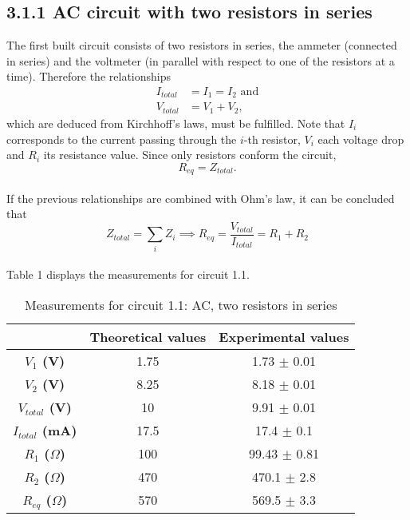 \documentclass[a4paper, 12pt]{article}
\begin{document}
\subsection{3.1.1 AC circuit with two resistors in series}
The first built circuit consists of two resistors in series, the ammeter (connected in series) and the voltmeter (in parallel with respect to one of the resistors at a time). Therefore the relationships
\begin{align*}\label{resser}
	I_{total} &= I_1 = I_2 \mbox{ and} \\
	V_{total} &= V_1 + V_2,
\end{align*}
which are deduced from Kirchhoff's laws, must be fulfilled. Note that $I_i$ corresponds to the current passing through the $i$-th resistor, $V_i$ each voltage drop and $R_i$ its resistance value. Since only resistors conform the circuit,
\begin{equation}\label{resserz}
	R_{eq} = Z_{total}.
\end{equation}\\

If the previous relationships are combined with Ohm's law, it can be concluded that
\begin{equation}\label{req}
	Z_{total} = \sum_{i} Z_i \implies R_{eq} = \frac{V_{total}}{I_{total}}= R_1 + R_2
\end{equation}\\

Table 1 displays the measurements for circuit 1.1.
\begin{table}[hbt!]
	\centering
	\begin{tabular}{|c|c|c|}
		\hline
		& \textbf{Theoretical values} & \textbf{Experimental values} \\
		\hline
		\textbf{$V_{1}$ (V)} & 1.75 & 1.73 $\pm$ 0.01 \\
		\textbf{$V_{2}$ (V)} & 8.25 & 8.18 $\pm$ 0.01 \\
		\textbf{$V_{total}$ (V)} & 10 & 9.91 $\pm$ 0.01 \\
		\hline
		\textbf{$I_{total}$ (mA)} & 17.5 & 17.4 $\pm$ 0.1 \\
		\hline
		\textbf{$R_{1}$ ($\Omega$)} & 100 & 99.43 $\pm$ 0.81 \\
		\textbf{$R_{2}$ ($\Omega$)} & 470 & 470.1 $\pm$ 2.8 \\
		\textbf{$R_{eq}$ ($\Omega$)} & 570 & 569.5 $\pm$ 3.3 \\
	
		\hline
	\end{tabular}
	\caption{Measurements for circuit 1.1: AC, two resistors in series}
\end{table}\\
\end{document}

